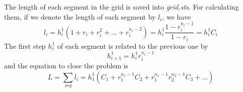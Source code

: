 The length of each segment in the grid is saved into \emph{grid.sts}. For
calculating them, if we denote the length of each segment by $l_i$, we have
\begin{equation}
l_i = h_i^1(1+r_i+r_i^2+\ldots+r_i^{n_i-2})=
h_i^1\frac{1-r_i^{n_i-1}}{1-r_i}=h_i^1C_i
\end{equation}
The first step $h_i^1$ of each segment is related to the previous one by
\begin{equation}
h_{i+1}^1 = h_i^1 r_i^{n_i-1}
\end{equation}
and the equation to close the problem is
\begin{equation}
L=\sum_{seg}l_i=h_1^1\left( C_1 + r_1^{n_1-1}C_2 + 
r_1^{n_1-1}r_2^{n_2-1}C_3 + \ldots \right)
\end{equation}

